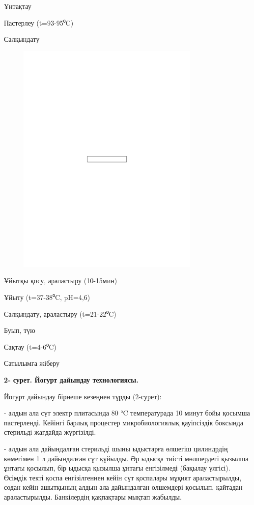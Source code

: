 Ұнтақтау

Пастерлеу (t=93-95⁰C)

Салқындату
\begin{figure}[H]
	\centering
	\includegraphics[width=0.8\textwidth]{media/pish3/image8}
	\caption*{}
\end{figure}


Ұйытқы қосу, араластыру (10-15мин)

Ұйыту (t=37-38⁰C, pH=4,6)

Салқындату, араластыру (t=21-22⁰C)

Буып, түю

Сақтау (t=4-6⁰C)

Сатылымға жіберу

{\bfseries 2- сурет. Йогурт дайындау технологиясы.}

Йогурт дайындау бірнеше кезеңнен тұрды (2-сурет):

- алдын ала сүт электр плитасында 80 °C температурада 10 минут бойы
қосымша пастерленді. Кейінгі барлық процестер микробиологиялық
қауіпсіздік боксында стерильді жағдайда жүргізілді.

- алдын ала дайындалған стерильді шыны ыдыстарға өлшегіш цилиндрдің
көмегімен 1 л дайындалған сүт құйылды. Әр ыдысқа тиісті мөлшердегі
қызылша ұнтағы қосылып, бір ыдысқа қызылша ұнтағы енгізілмеді (бақылау
үлгісі). Өсімдік текті қоспа енгізілгеннен кейін сүт қоспалары мұқият
араластырылды, содан кейін ашытқының алдын ала дайындалған өлшемдері
қосылып, қайтадан араластырылды. Банкілердің қақпақтары мықтап жабылды.

